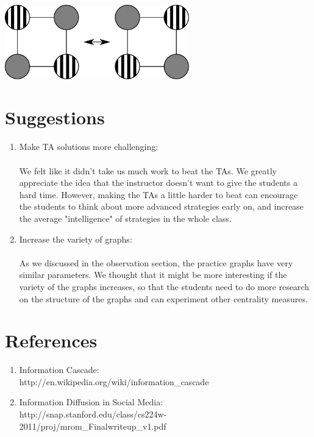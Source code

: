 \documentclass[12pt]{article}
\begin{document}
\includegraphics[width=8cm]{counter.pdf}

\section{Suggestions}
\begin{enumerate}
\item Make TA solutions more challenging: \\\\We felt like it didn't take us much work to beat the TAs.  We greatly appreciate the idea that the instructor doesn't want to give the students a hard time. However, making the TAs a little harder to beat can encourage the students to think about more advanced strategies early on, and increase the average "intelligence" of strategies in the whole class.   
\item Increase the variety of graphs: \\\\As we discussed in the observation section, the practice graphs have very similar parameters. We thought that it might be more interesting if the variety of the graphs increases, so that the students need to do more research on the structure of the graphs and can experiment other centrality measures. 
\end{enumerate}


\section{References}
\begin{enumerate}
\item Information Cascade:\\
 http://en.wikipedia.org/wiki/information\_cascade
\item Information Diffusion in Social Media: \\
 http://snap.stanford.edu/class/cs224w-2011/proj/mrom\_Finalwriteup\_v1.pdf

\end{enumerate}
\end{document}

